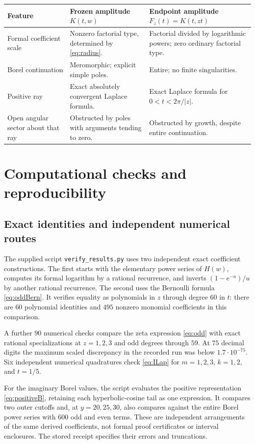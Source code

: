 \documentclass[11pt,a4paper]{article}
\numberwithin{equation}{section}
\theoremstyle{definition}
\theoremstyle{remark}
\newcommand{\e}{\mathrm e}
\begin{document}
\begin{center}
\begin{tabularx}{\textwidth}{@{}>{\raggedright\arraybackslash}p{}YY@{}}
\toprule
Feature & Frozen amplitude $K(t,w)$ & Endpoint amplitude $F_z(t)=K(t,zt)$\\
\midrule
Formal coefficient scale & Nonzero factorial type, determined by \eqref{eq:radius}. & Factorial divided by logarithmic powers; zero ordinary factorial type.\\
Borel continuation & Meromorphic; explicit simple poles. & Entire; no finite singularities.\\
Positive ray & Exact absolutely convergent Laplace formula. & Exact Laplace formula for $0<t<2\pi/|z|$.\\
Open angular sector about that ray & Obstructed by poles with arguments tending to zero. & Obstructed by growth, despite entire continuation.\\
\bottomrule
\end{tabularx}
\end{center}

\section{Computational checks and reproducibility}
\label{sec:checks}

\subsection{Exact identities and independent numerical routes}
The supplied script \texttt{verify\_results.py} uses two independent exact coefficient constructions. The first starts with the elementary power series of $H(w)$, computes its formal logarithm by a rational recurrence, and inverts $(1-\e^{-u})/u$ by another rational recurrence. The second uses the Bernoulli formula \eqref{eq:oddBern}. It verifies equality as polynomials in $z$ through degree $60$ in $t$: there are $60$ polynomial identities and $495$ nonzero monomial coefficients in this comparison.

A further $90$ numerical checks compare the zeta expression \eqref{eq:odd} with exact rational specializations at $z=1,2,3$ and odd degrees through $59$. At $75$ decimal digits the maximum scaled discrepancy in the recorded run was below $1.7\cdot10^{-75}$. Six independent numerical quadratures check \eqref{eq:ILap} for $m=1,2,3$, $k=1,2$, and $t=1/5$.

For the imaginary Borel values, the script evaluates the positive representation \eqref{eq:positiveB}, retaining each hyperbolic-cosine tail as one expression. It compares two outer cutoffs and, at $y=20,25,30$, also compares against the entire Borel power series with $600$ odd and even terms. These are independent arrangements of the same derived coefficients, not formal proof certificates or interval enclosures. The stored receipt specifies their errors and truncations.
\end{document}
